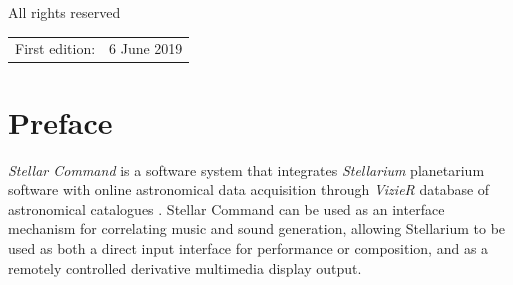 \documentclass[10pt,a4paper,extrafontsizes]{memoir}
\newif\ifMASTER
\newcommand\svnidlong[4]{}
\begin{document}
All rights reserved



\begin{center}
\begin{tabular}{ll}
First edition:                        & 6 June 2019 \\

\end{tabular}
\end{center}
\ifMASTER
Manual last changed \svnyear/\svnmonth/\svnday
\fi

\endgroup

\clearpage

\pagestyle{headings}

\setupshorttoc
\tableofcontents
\clearpage
\setupparasubsecs
\setupmaintoc

\begingroup

%




\tableofcontents

\endgroup


\setlength{\unitlength}{1pt}
\clearpage
\listoffigures
\clearpage
\listoftables
\clearpage




\svnidlong
{$Ignore: $}
{$LastChangedDate: 2014-11-05 16:28:11 +0100 (Wed, 05 Nov 2014) $}
{$LastChangedRevision: 501 $}
{$LastChangedBy: daleif $}

\chapter{Preface}
    
    \textit{Stellar Command} is a software system that integrates \textit{Stellarium} planetarium software with online astronomical data acquisition through \textit{VizieR} database of astronomical catalogues \cite{ochsenbein2000vizier}. Stellar Command can be used as an interface mechanism for correlating music and sound generation, allowing Stellarium to be used as both a direct input interface for performance or composition, and as a remotely controlled derivative multimedia display output.   
\end{document}
